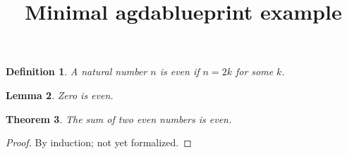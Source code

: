\documentclass{article}
\title{Minimal agdablueprint example}
\newtheorem{definition}{Definition}
\newtheorem{lemma}[definition]{Lemma}
\newtheorem{theorem}[definition]{Theorem}
\begin{document}
\maketitle

\begin{definition}\label{def:even}
  \agdaok
A natural number $n$ is \emph{even} if $n = 2k$ for some $k$.
\end{definition}

\begin{lemma}\label{lem:zero-even}
  \agdaok
Zero is even.
\end{lemma}

\begin{theorem}\label{thm:sum-even}
The sum of two even numbers is even.
\end{theorem}

\begin{proof}
By induction; not yet formalized.
\end{proof}
\end{document}
